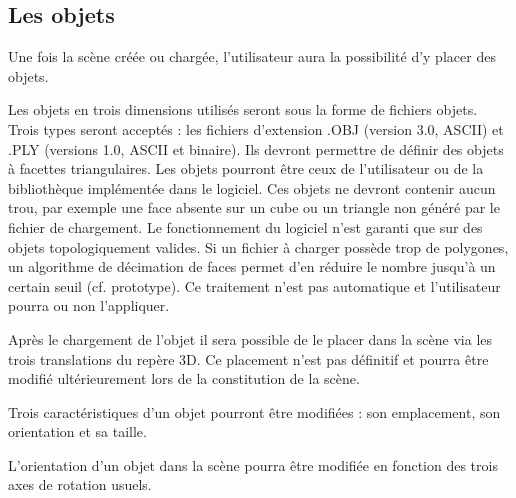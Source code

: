 \subsection{Les objets}
Une fois la scène créée ou chargée, l’utilisateur aura la possibilité d’y placer des objets.

\begin{description}[style=nextline]
	\item[Chargement des fichiers objets]
	\mbox{\hspace{1cm}} Les objets en trois dimensions utilisés seront sous la forme de fichiers objets. Trois types seront acceptés : les fichiers d’extension .OBJ (version 3.0, ASCII) et .PLY (versions 1.0, ASCII et binaire). Ils devront permettre de définir des objets à facettes triangulaires. Les objets pourront être ceux de l’utilisateur ou de la bibliothèque implémentée dans le logiciel. \newline
	\mbox{\hspace{1cm}}Ces objets ne devront contenir aucun trou, par exemple une face absente sur un cube ou un triangle non généré par le fichier de chargement. Le fonctionnement du logiciel n’est garanti que sur des objets topologiquement valides. \newline
	\mbox{\hspace{1cm}}Si un fichier à charger possède trop de polygones, un algorithme de décimation de faces permet d’en réduire le nombre jusqu’à un certain seuil (cf. prototype). Ce traitement n’est pas automatique et l’utilisateur pourra ou non l’appliquer.
	
	\item[Placement d'un objet]
	\mbox{\hspace{1cm}} Après le chargement de l’objet il sera possible de le placer dans la scène via les trois translations du repère 3D. Ce placement n’est pas définitif et pourra être modifié ultérieurement lors de la constitution de la scène.
	
	\item[Modification d'un objet]
	\mbox{\hspace{1cm}}Trois caractéristiques d’un objet pourront être modifiées : son emplacement, son orientation et sa taille.
	
	\item[Modification de l'orientation d'un objet]
		\mbox{\hspace{1cm}}	L’orientation d’un objet dans la scène pourra être modifiée en fonction des trois axes de rotation usuels.
	

\end{description}
